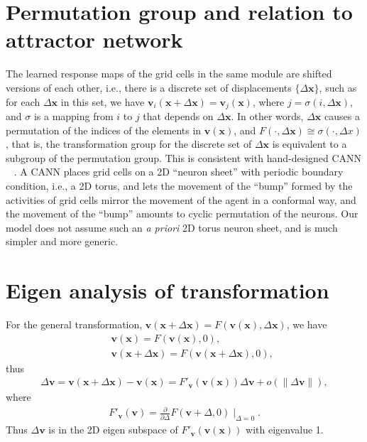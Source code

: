 \documentclass{article}
\def\vv{{\bm{v}}}
\def\vx{{\bm{x}}}
\begin{document}
\section{Permutation group and relation to attractor network}
 \label{sec:more2}

The learned response maps of the grid cells in the same module are shifted versions of each other, i.e., there is a discrete set of displacements $\{\Delta \vx\}$, such as for each $\Delta \vx$ in this set, we have $\vv_i(\vx + \Delta \vx) = \vv_j(\vx)$, where $j = \sigma(i, \Delta \vx)$, and $\sigma$ is a mapping from $i$ to $j$ that depends on $\Delta \vx$. In other words, $\Delta \vx$ causes a permutation of the indices of the elements in $\vv(\vx)$, and $F(\cdot, \Delta \vx) \cong \sigma(\cdot, \Delta x)$, that is, the transformation group for the discrete set of $\Delta \vx$ is equivalent to a subgroup of the permutation group. This is consistent with hand-designed CANN ~\citep{amit1992modeling,burak2009accurate,Couey2013,Pastoll2013,Agmon2020} . A CANN places grid cells on a 2D ``neuron sheet'' with periodic boundary condition, i.e., a 2D torus, and lets the movement of the ``bump'' formed by the activities of grid cells mirror the movement of the agent in a conformal way, and the movement of the ``bump'' amounts to cyclic permutation of the neurons. Our model does not assume such an {\em a priori} 2D torus neuron sheet, and is much simpler and more generic. 

\section{Eigen analysis of transformation}
\label{sec:more1}

For the general transformation, $\vv(\vx+\Delta \vx) = F(\vv(\vx), \Delta \vx)$, we have 
\begin{eqnarray}
  && \vv(\vx) = F(\vv(\vx), 0), \\
  && \vv(\vx+\Delta \vx) = F(\vv(\vx+\Delta \vx), 0),
\end{eqnarray}
thus 
\begin{eqnarray}
   \Delta \vv = \vv(\vx+\Delta \vx) - \vv(\vx) = F'_\vv(\vv(\vx)) \Delta \vv + o(\|\Delta \vv\|),  
\end{eqnarray}
where 
\begin{eqnarray}
   F'_\vv(\vv) = \frac{\partial}{\partial \Delta} F(\vv+\Delta, 0) \mid_{\Delta = 0}. 
\end{eqnarray}
Thus $\Delta \vv$ is in the 2D eigen subspace of $F'_\vv(\vv(\vx))$ with eigenvalue 1. 
\end{document}
